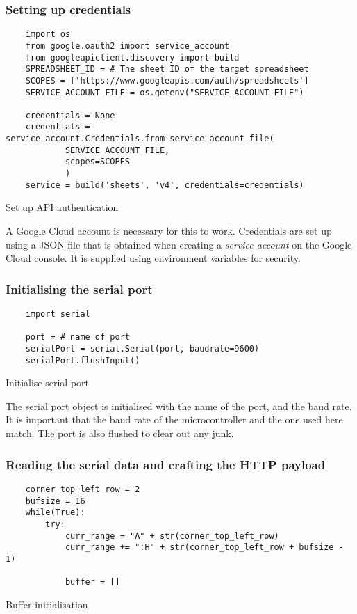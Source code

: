 \documentclass[./main.tex]{subfiles}
\begin{document}
\subsubsection{Setting up credentials}
\begin{code}
    \begin{verbatim}
    import os
    from google.oauth2 import service_account
    from googleapiclient.discovery import build
    SPREADSHEET_ID = # The sheet ID of the target spreadsheet
    SCOPES = ['https://www.googleapis.com/auth/spreadsheets']
    SERVICE_ACCOUNT_FILE = os.getenv("SERVICE_ACCOUNT_FILE")

    credentials = None
    credentials = service_account.Credentials.from_service_account_file(
            SERVICE_ACCOUNT_FILE,
            scopes=SCOPES
            )
    service = build('sheets', 'v4', credentials=credentials)
    \end{verbatim}
    \caption{Set up API authentication}
    \label{code:apiauth}
\end{code}
\vspace{0.5cm}

A Google Cloud account is necessary for this to work.  Credentials are set up
using a JSON file that is obtained when creating a \textit{service account} on
the Google Cloud console. It is supplied using environment variables for
security.

\subsubsection{Initialising the serial port}
\begin{code}
    \begin{verbatim}
    import serial

    port = # name of port
    serialPort = serial.Serial(port, baudrate=9600)
    serialPort.flushInput()
    \end{verbatim}
    \caption{Initialise serial port}
    \label{code:initser}
\end{code}
\vspace{0.5cm}

The serial port object is initialised with the name of the port, and the baud
rate. It is important that the baud rate of the microcontroller and the one
used here match. The port is also flushed to clear out any junk.

\subsubsection{Reading the serial data and crafting the HTTP payload}
\begin{code}
    \begin{verbatim}
    corner_top_left_row = 2
    bufsize = 16
    while(True):
        try:
            curr_range = "A" + str(corner_top_left_row)
            curr_range += ":H" + str(corner_top_left_row + bufsize - 1)

            buffer = []
    \end{verbatim}
    \caption{Buffer initialisation}
    \label{code:initbuf}
\end{code}
\vspace{0.5cm}
\end{document}
